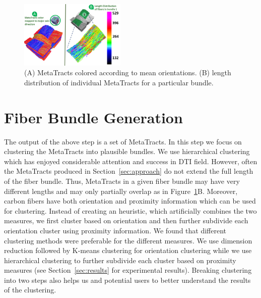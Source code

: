 

\begin{figure}[tb]
\centering
	\includegraphics[width=0.45\textwidth]{imagesMT2014/crop-16/length_dist.png}
	\caption{(A) MetaTracts colored according to mean orientations. (B) length distribution of individual MetaTracts for a particular bundle.}
	\label{fig:length_distribution}
\end{figure}


\section {Fiber Bundle Generation}
\label{subsec:fiber-bundles}
The output of the above step is a set of MetaTracts. In this step we focus on clustering the MetaTracts into plausible bundles. We use hierarchical clustering which has enjoyed considerable attention and success in DTI field. However, often the MetaTracts produced in Section~\ref{sec:approach} do not extend the full length of the fiber bundle. Thus, MetaTracts in a given fiber bundle may have very different lengths and may only partially overlap as in Figure~\ref{fig:length_distribution}B. Moreover, carbon fibers have both orientation and proximity information which can be used for clustering. Instead of creating an heuristic, which artificially combines the two measures, we first cluster based on orientation and then further subdivide each orientation cluster using proximity information. We found that different clustering methods were preferable for the different measures. We use dimension reduction followed by K-means clustering for orientation clustering while we use hierarchical clustering to further subdivide each cluster based on proximity measures (see Section~\ref{sec:results} for experimental results). Breaking clustering into two steps also helps us and potential users to better understand the results of the clustering.

